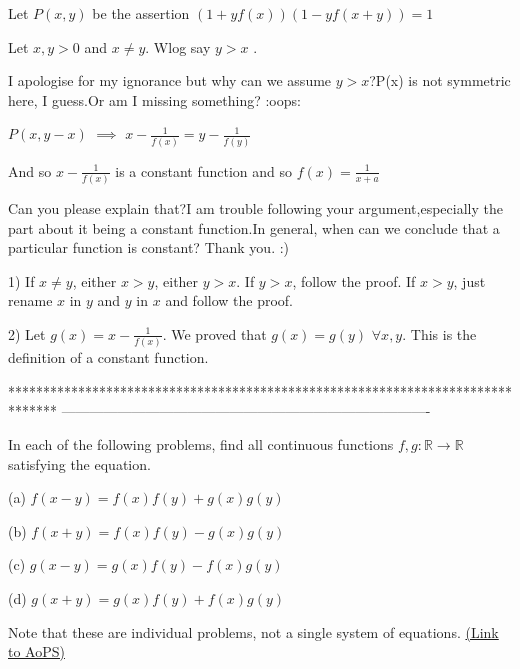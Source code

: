 \begin{solution}
	\begin{tcolorbox}
Let $P(x,y)$ be the assertion $(1+yf(x))(1-yf(x+y))=1$

Let $x,y>0$ and $x\ne y$. Wlog say $y>x$ .

\end{tcolorbox}
I apologise for my ignorance but why can we assume $y>x$?P(x) is not symmetric here, I guess.Or am I missing something?   :oops: 
\begin{tcolorbox} $P(x,y-x)$ $\implies$ $x-\frac 1{f(x)}=y-\frac 1{f(y)}$

And so $x-\frac 1{f(x)}$ is a constant function and so $f(x)=\frac 1{x+a}$ \end{tcolorbox}
Can you please explain that?I am trouble following your argument,especially the part about it being  a constant function.In general, when can we conclude that a particular function is constant?
Thank you. :)
\end{solution}



\begin{solution}
	1) If $x\ne y$, either $x>y$, either $y>x$. 
If $y>x$, follow the proof. If $x>y$, just rename $x$ in $y$ and $y$ in $x$ and follow the proof.

2) Let $g(x)=x-\frac 1{f(x)}$. We proved that $g(x)=g(y)$ $\forall x,y$. This is the definition of a constant function.
\end{solution}
*******************************************************************************
-------------------------------------------------------------------------------

\begin{problem}
	In each of the following problems, find all continuous functions $f,g:\mathbb{R}\to \mathbb{R}$ satisfying the equation.

(a)	$f(x-y)=f(x)f(y)+g(x)g(y)$

(b)	$f(x+y)=f(x)f(y)-g(x)g(y)$

(c)	$g(x-y)=g(x)f(y)-f(x)g(y)$

(d)	$g(x+y)=g(x)f(y)+f(x)g(y)$

Note that these are individual problems, not a single system of equations.
	\flushright \href{https://artofproblemsolving.com/community/c6h442145}{(Link to AoPS)}
\end{problem}



